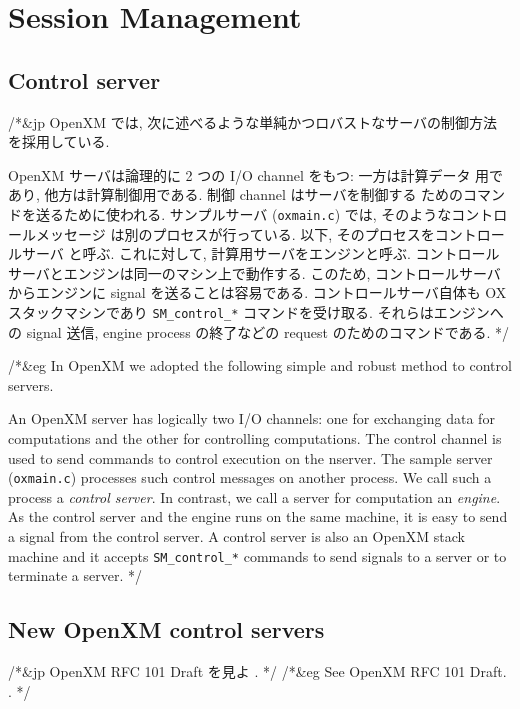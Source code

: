 \section{Session Management}

\subsection{Control server}
/*&jp
OpenXM では, 次に述べるような単純かつロバストなサーバの制御方法
を採用している. 

OpenXM サーバは論理的に 2 つの I/O channel をもつ: 一方は計算データ
用であり, 他方は計算制御用である. 制御 channel はサーバを制御する
ためのコマンドを送るために使われる. 
サンプルサーバ ({\tt oxmain.c}) では, そのようなコントロールメッセージ
は別のプロセスが行っている. 以下, そのプロセスをコントロールサーバ
と呼ぶ. これに対して, 計算用サーバをエンジンと呼ぶ. 
コントロールサーバとエンジンは同一のマシン上で動作する. 
このため, コントロールサーバからエンジンに signal を送ることは容易である. 
コントロールサーバ自体も OX スタックマシンであり
{\tt SM\_control\_*} コマンドを受け取る. それらはエンジンへの
signal 送信, engine process の終了などの request のためのコマンドである. 
*/

/*&eg
In OpenXM we adopted the following simple and robust method to 
control servers.

An OpenXM server has logically two I/O channels: one for exchanging
data for computations and the other for controlling computations. The
control channel is used to send commands to control execution on the
nserver. The sample server ({\tt oxmain.c}) processes such control
messages on another process. We call such a process a {\it
control server}. In contrast, we call a server for computation an {\it
engine}. As the control server and the engine runs on the
same machine, it is easy to send a signal from the control server. 
A control server is also an
OpenXM stack machine and it accepts {\tt SM\_control\_*} commands
to send signals to a server or to terminate a server.
*/

\subsection{New OpenXM control servers}
/*&jp
OpenXM RFC 101 Draft を見よ
.
*/
/*&eg
See OpenXM RFC 101 Draft.
.
*/

